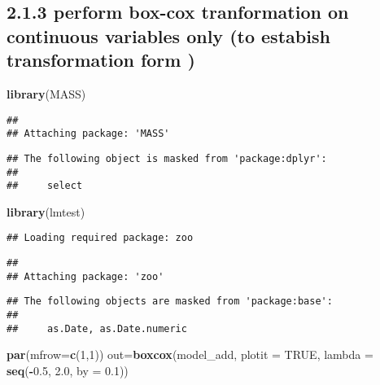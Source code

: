 \documentclass[]{article}
\newenvironment{Shaded}{\begin{snugshade}}{\end{snugshade}}
\newcommand{\DataTypeTok}[1]{\textcolor[rgb]{0.13,0.29,0.53}{#1}}
\newcommand{\DecValTok}[1]{\textcolor[rgb]{0.00,0.00,0.81}{#1}}
\newcommand{\FloatTok}[1]{\textcolor[rgb]{0.00,0.00,0.81}{#1}}
\newcommand{\KeywordTok}[1]{\textcolor[rgb]{0.13,0.29,0.53}{\textbf{#1}}}
\newcommand{\NormalTok}[1]{#1}
\newcommand{\OperatorTok}[1]{\textcolor[rgb]{0.81,0.36,0.00}{\textbf{#1}}}
\newcommand{\OtherTok}[1]{\textcolor[rgb]{0.56,0.35,0.01}{#1}}
\begin{document}
\hypertarget{perform-box-cox-tranformation-on-continuous-variables-only-to-estabish-transformation-form}{%
\subsection{2.1.3 perform box-cox tranformation on continuous variables
only (to estabish transformation form
)}\label{perform-box-cox-tranformation-on-continuous-variables-only-to-estabish-transformation-form}}

\begin{Shaded}
\begin{Highlighting}[]
\KeywordTok{library}\NormalTok{(MASS)}
\end{Highlighting}
\end{Shaded}

\begin{verbatim}
## 
## Attaching package: 'MASS'
\end{verbatim}

\begin{verbatim}
## The following object is masked from 'package:dplyr':
## 
##     select
\end{verbatim}

\begin{Shaded}
\begin{Highlighting}[]
\KeywordTok{library}\NormalTok{(lmtest)}
\end{Highlighting}
\end{Shaded}

\begin{verbatim}
## Loading required package: zoo
\end{verbatim}

\begin{verbatim}
## 
## Attaching package: 'zoo'
\end{verbatim}

\begin{verbatim}
## The following objects are masked from 'package:base':
## 
##     as.Date, as.Date.numeric
\end{verbatim}

\begin{Shaded}
\begin{Highlighting}[]
\KeywordTok{par}\NormalTok{(}\DataTypeTok{mfrow=}\KeywordTok{c}\NormalTok{(}\DecValTok{1}\NormalTok{,}\DecValTok{1}\NormalTok{))}
\NormalTok{out=}\KeywordTok{boxcox}\NormalTok{(model_add, }\DataTypeTok{plotit =} \OtherTok{TRUE}\NormalTok{, }\DataTypeTok{lambda =} \KeywordTok{seq}\NormalTok{(}\OperatorTok{-}\FloatTok{0.5}\NormalTok{, }\FloatTok{2.0}\NormalTok{, }\DataTypeTok{by =} \FloatTok{0.1}\NormalTok{))}
\end{Highlighting}
\end{Shaded}
\end{document}
